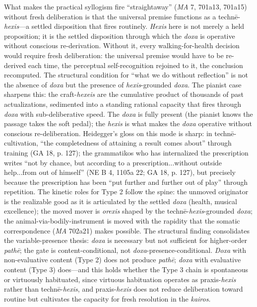 What makes the practical syllogism fire ``straightaway'' (\textit{MA} 7, 701a13, 701a15) without fresh deliberation is that the universal premise functions as a technē-\textit{hexis}---a settled disposition that fires routinely. \textit{Hexis} here is not merely a held proposition; it is the settled disposition through which the \textit{doxa} is operative without conscious re-derivation. Without it, every walking-for-health decision would require fresh deliberation: the universal premise would have to be re-derived each time, the perceptual self-recognition rejoined to it, the conclusion recomputed. The structural condition for ``what we do without reflection'' is not the absence of \textit{doxa} but the presence of \textit{hexis}-grounded \textit{doxa}. The pianist case sharpens this: the craft-\textit{hexeis} are the cumulative product of thousands of past actualizations, sedimented into a standing rational capacity that fires through \textit{doxa} with sub-deliberative speed. The \textit{doxa} is fully present (the pianist knows the passage takes the soft pedal); the \textit{hexis} is what makes the \textit{doxa} operative without conscious re-deliberation. Heidegger's gloss on this mode is sharp: in technē-cultivation, ``the completedness of attaining a result comes about'' through training (GA 18, p. 127); the grammatikos who has internalized the prescription writes ``not by chance, but according to a prescription...without outside help...from out of himself'' (NE B 4, 1105a 22; GA 18, p. 127), but precisely because the prescription has been ``put further and further out of play'' through repetition. The kinetic roles for Type 2 follow the spine: the unmoved originator is the realizable good as it is articulated by the settled \textit{doxa} (health, musical excellence); the moved mover is \textit{orexis} shaped by the technē-\textit{hexis}-grounded \textit{doxa}; the animal-via-bodily-instrument is moved with the rapidity that the somatic correspondence (\textit{MA} 702a21) makes possible. The structural finding consolidates the variable-presence thesis: \textit{doxa} is necessary but not sufficient for higher-order \textit{pathē}; the gate is content-conditional, not \textit{doxa}-presence-conditional. \textit{Doxa} with non-evaluative content (Type 2) does not produce \textit{pathē}; \textit{doxa} with evaluative content (Type 3) does---and this holds whether the Type 3 chain is spontaneous or virtuously habituated, since virtuous habituation operates as praxis-\textit{hexis} rather than technē-\textit{hexis}, and praxis-\textit{hexis} does not reduce deliberation toward routine but cultivates the capacity for fresh resolution in the \textit{kairos}.

